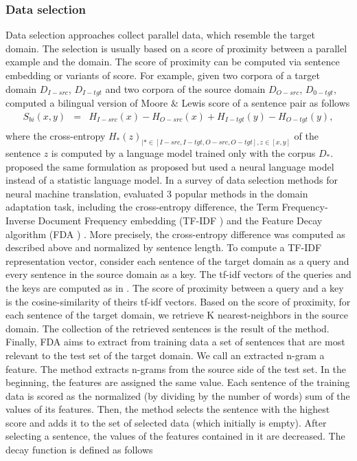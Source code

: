 \subsubsection{Data selection}
Data selection approaches collect parallel data, which resemble the target domain. The selection is usually based on a score of proximity between a parallel example and the domain. The score of proximity can be computed via sentence embedding or variants of \citeauthor{Moore10intelligent} score. For example, given two corpora of a target domain $D_{I-src}$, $D_{I-tgt}$ and two corpora of the source domain $D_{O-src}$, $D_{0-tgt}$, \citet{Axelrod11domain} computed a bilingual version of Moore $\&$ Lewis score of a sentence pair as follows
\begin{equation}
\begin{array}{rcl}
S_{bi} (x,y) &=& H_{I-src}(x) - H_{O-src}(x) + H_{I-tgt}(y) - H_{O-tgt}(y), \\
\end{array}
\label{eq:ced}
\end{equation}
where the cross-entropy $H_{*}(z)_{| * \in [I-src, I-tgt, O-src, O-tgt], z \in [x,y]}$ of the sentence $z$ is computed by a language model trained only with the corpus $D_{*}$. \citet{Duh13adaptation} proposed the same formulation as proposed \citet{Axelrod11domain} but used a neural language model instead of a statistic language model. In a survey of data selection methods for neural machine translation, \citet{Silva18extracting} evaluated 3 popular methods in the domain adaptation task, including the cross-entropy difference, the Term Frequency-Inverse Document Frequency embedding (TF-IDF ) \citep{Salton73On} and the Feature Decay algorithm (FDA ) \citep{Poncelas18Feature}. More precisely, the cross-entropy difference was computed as described above and normalized by sentence length. To compute a TF-IDF representation vector, \citet{Silva18extracting} consider each sentence of the target domain as a query and every sentence in the source domain as a key. The tf-idf vectors of the queries and the keys are computed as in \citet{Salton73On}. The score of proximity between a query and a key is the cosine-similarity of theirs tf-idf vectors. Based on the score of proximity, for each sentence of the target domain, we retrieve K nearest-neighbors in the source domain. The collection of the retrieved sentences is the result of the method. Finally, FDA aims to extract from training data a set of sentences that are most relevant to the test set of the target domain. We call an extracted n-gram a feature. The method extracts n-grams from the source side of the test set. In the beginning, the features are assigned the same value. Each sentence of the training data is scored as the normalized (by dividing by the number of words) sum of the values of its features. Then, the method selects the sentence with the highest score and adds it to the set of selected data (which initially is empty). After selecting a sentence, the values of the features contained in it are decreased. The decay function is defined as follows
